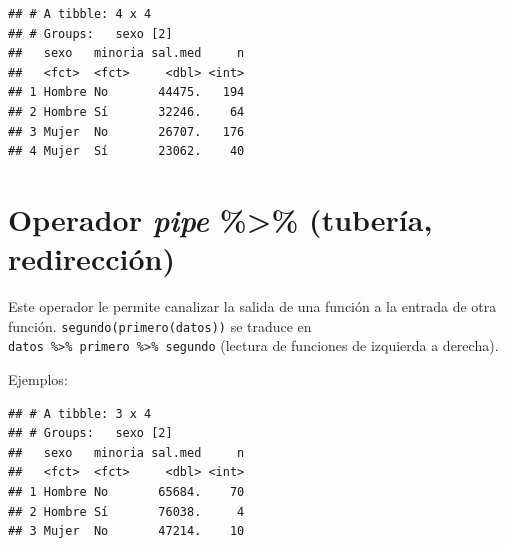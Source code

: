 \documentclass[]{book}
\newenvironment{Shaded}{\begin{snugshade}}{\end{snugshade}}
\newcommand{\KeywordTok}[1]{\textcolor[rgb]{0.13,0.29,0.53}{\textbf{#1}}}
\newcommand{\DataTypeTok}[1]{\textcolor[rgb]{0.13,0.29,0.53}{#1}}
\newcommand{\StringTok}[1]{\textcolor[rgb]{0.31,0.60,0.02}{#1}}
\newcommand{\OperatorTok}[1]{\textcolor[rgb]{0.81,0.36,0.00}{\textbf{#1}}}
\newcommand{\NormalTok}[1]{#1}
\begin{document}
\begin{verbatim}
## # A tibble: 4 x 4
## # Groups:   sexo [2]
##   sexo   minoria sal.med     n
##   <fct>  <fct>     <dbl> <int>
## 1 Hombre No       44475.   194
## 2 Hombre Sí       32246.    64
## 3 Mujer  No       26707.   176
## 4 Mujer  Sí       23062.    40
\end{verbatim}

\section{\texorpdfstring{Operador \emph{pipe}
\textbf{\%\textgreater{}\%} (tubería,
redirección)}{Operador pipe \%\textgreater{}\% (tubería, redirección)}}\label{operador-pipe-tuberia-redireccion}

Este operador le permite canalizar la salida de una función a la entrada
de otra función. \texttt{segundo(primero(datos))} se traduce en
\texttt{datos\ \%\textgreater{}\%\ primero\ \%\textgreater{}\%\ segundo}
(lectura de funciones de izquierda a derecha).

Ejemplos:

\begin{Shaded}
\end{Shaded}

\begin{verbatim}
## # A tibble: 3 x 4
## # Groups:   sexo [2]
##   sexo   minoria sal.med     n
##   <fct>  <fct>     <dbl> <int>
## 1 Hombre No       65684.    70
## 2 Hombre Sí       76038.     4
## 3 Mujer  No       47214.    10
\end{verbatim}
\end{document}
